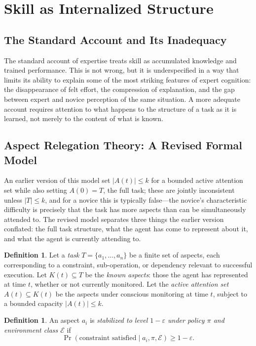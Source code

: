 \documentclass[12pt, a4paper]{article}
\theoremstyle{plain}
\theoremstyle{definition}
\newtheorem{definition}[proposition]{Definition}
\theoremstyle{remark}
\begin{document}
\section{Skill as Internalized Structure}
\label{sec:relegation}

\subsection{The Standard Account and Its Inadequacy}

The standard account of expertise treats skill as accumulated knowledge and trained performance. This is not wrong, but it is underspecified in a way that limits its ability to explain some of the most striking features of expert cognition: the disappearance of felt effort, the compression of explanation, and the gap between expert and novice perception of the same situation. A more adequate account requires attention to what happens to the structure of a task as it is learned, not merely to the content of what is known.

\subsection{Aspect Relegation Theory: A Revised Formal Model}
\label{subsec:art-formal}

An earlier version of this model set $|A(t)| \leq k$ for a bounded active attention set while also setting $A(0) = T$, the full task; these are jointly inconsistent unless $|T| \leq k$, and for a novice this is typically false---the novice's characteristic difficulty is precisely that the task has more aspects than can be simultaneously attended to. The revised model separates three things the earlier version conflated: the full task structure, what the agent has come to represent about it, and what the agent is currently attending to.

\begin{definition}
Let a \emph{task} $T = \{a_1, \dots, a_n\}$ be a finite set of aspects, each corresponding to a constraint, sub-operation, or dependency relevant to successful execution. Let $K(t) \subseteq T$ be the \emph{known aspects}: those the agent has represented at time $t$, whether or not currently monitored. Let the \emph{active attention set} $A(t) \subseteq K(t)$ be the aspects under conscious monitoring at time $t$, subject to a bounded capacity $|A(t)| \leq k$.
\end{definition}

\begin{definition}
An aspect $a_i$ is \emph{stabilized to level $1-\varepsilon$ under policy $\pi$ and environment class $\mathcal{E}$} if
\[
\Pr(\text{constraint satisfied} \mid a_i, \pi, \mathcal{E}) \geq 1 - \varepsilon.
\]
\end{definition}
\end{document}
